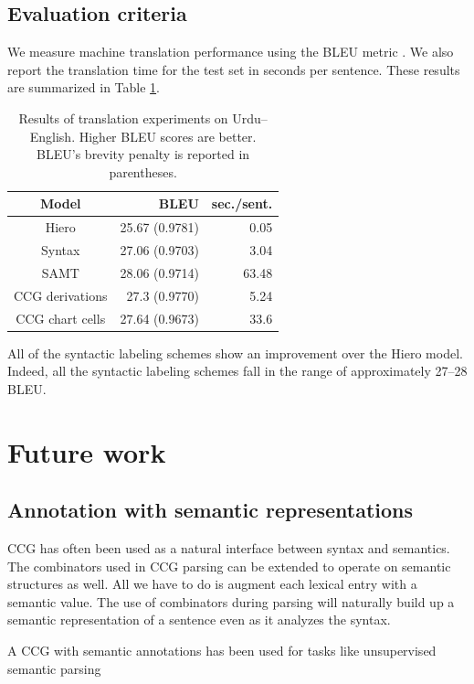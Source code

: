 \documentclass[a4paper]{article}
\begin{document}
\subsection{Evaluation criteria}

We measure machine translation performance using the BLEU metric \cite{papineni-bleu}. We also report the translation time for the test set in seconds per sentence. These results are summarized in Table \ref{table:results}.

\begin{table}
\centering
\begin{tabular}{|c|r|r|}
\hline
Model & BLEU & sec./sent. \\
\hline
Hiero & 25.67 (0.9781) & 0.05 \\
Syntax & 27.06 (0.9703) & 3.04 \\
SAMT & 28.06 (0.9714) & 63.48 \\
CCG derivations & 27.3 (0.9770) & 5.24 \\
CCG chart cells & 27.64 (0.9673) & 33.6 \\
\hline
\end{tabular}
\caption{Results of translation experiments on Urdu--English. Higher BLEU scores are better. BLEU's brevity penalty is reported in parentheses.\label{table:results}}
\end{table}

All of the syntactic labeling schemes show an improvement over the Hiero model. Indeed, all the syntactic labeling schemes fall in the range of approximately 27--28 BLEU.

\section{Future work}

\subsection{Annotation with semantic representations}

CCG has often been used as a natural interface between syntax and semantics. The combinators used in CCG parsing can be extended to operate on semantic structures as well. All we have to do is augment each lexical entry with a semantic value. The use of combinators during parsing will naturally build up a semantic representation of a sentence even as it analyzes the syntax.

A CCG with semantic annotations has been used for tasks like unsupervised semantic parsing
\end{document}
